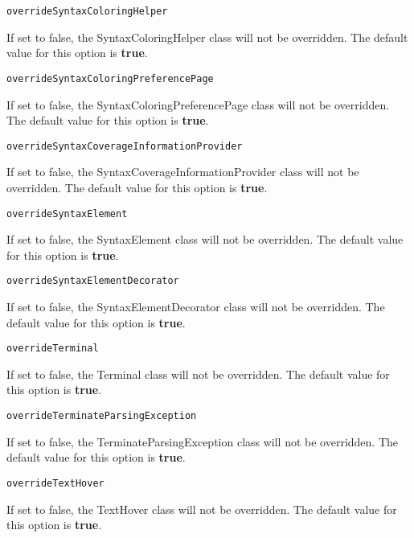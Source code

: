 \noindent\texttt{overrideSyntaxColoringHelper}
\begin{myindentpar}{1cm}
If set to false, the SyntaxColoringHelper class will not be overridden. The default value for this option is \textbf{true}.
\end{myindentpar}

\noindent\texttt{overrideSyntaxColoringPreferencePage}
\begin{myindentpar}{1cm}
If set to false, the SyntaxColoringPreferencePage class will not be overridden. The default value for this option is \textbf{true}.
\end{myindentpar}

\noindent\texttt{overrideSyntaxCoverageInformationProvider}
\begin{myindentpar}{1cm}
If set to false, the SyntaxCoverageInformationProvider class will not be overridden. The default value for this option is \textbf{true}.
\end{myindentpar}

\noindent\texttt{overrideSyntaxElement}
\begin{myindentpar}{1cm}
If set to false, the SyntaxElement class will not be overridden. The default value for this option is \textbf{true}.
\end{myindentpar}

\noindent\texttt{overrideSyntaxElementDecorator}
\begin{myindentpar}{1cm}
If set to false, the SyntaxElementDecorator class will not be overridden. The default value for this option is \textbf{true}.
\end{myindentpar}

\noindent\texttt{overrideTerminal}
\begin{myindentpar}{1cm}
If set to false, the Terminal class will not be overridden. The default value for this option is \textbf{true}.
\end{myindentpar}

\noindent\texttt{overrideTerminateParsingException}
\begin{myindentpar}{1cm}
If set to false, the TerminateParsingException class will not be overridden. The default value for this option is \textbf{true}.
\end{myindentpar}

\noindent\texttt{overrideTextHover}
\begin{myindentpar}{1cm}
If set to false, the TextHover class will not be overridden. The default value for this option is \textbf{true}.
\end{myindentpar}

